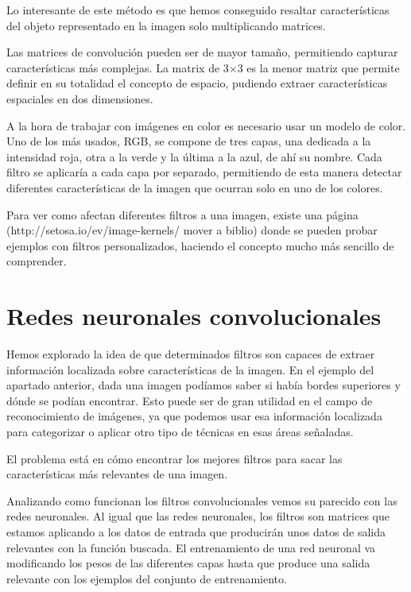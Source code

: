 Lo interesante de este método es que hemos conseguido resaltar características del objeto representado en la imagen solo multiplicando matrices.

Las matrices de convolución pueden ser de mayor tamaño, permitiendo capturar características más complejas. La matrix de 3$\times$3 es la menor matriz que permite definir en su totalidad el concepto de espacio, pudiendo extraer características espaciales en dos dimensiones.

A la hora de trabajar con imágenes en color es necesario usar un modelo de color. Uno de los más usados, RGB, se compone de tres capas, una dedicada a la intensidad roja, otra a la verde y la última a la azul, de ahí su nombre. Cada filtro se aplicaría a cada capa por separado, permitiendo de esta manera detectar diferentes características de la imagen que ocurran solo en uno de los colores.

Para ver como afectan diferentes filtros a una imagen, existe una página (http://setosa.io/ev/image-kernels/ mover a biblio) donde se pueden probar ejemplos con filtros personalizados, haciendo el concepto mucho más sencillo de comprender.

\section{Redes neuronales convolucionales}
\label{sec:conv-net}

Hemos explorado la idea de que determinados filtros son capaces de extraer información localizada sobre características de la imagen. En el ejemplo del apartado anterior, dada una imagen podíamos saber si había bordes superiores y dónde se podían encontrar. Esto puede ser de gran utilidad en el campo de reconocimiento de imágenes, ya que podemos usar esa información localizada para categorizar o aplicar otro tipo de técnicas en esas áreas señaladas.

El problema está en cómo encontrar los mejores filtros para sacar las características más relevantes de una imagen.

Analizando como funcionan los filtros convolucionales vemos su parecido con las redes neuronales. Al igual que las redes neuronales, los filtros son matrices que estamos aplicando a los datos de entrada que producirán unos datos de salida relevantes con la función buscada. El entrenamiento de una red neuronal va modificando los pesos de las diferentes capas hasta que produce una salida relevante con los ejemplos del conjunto de entrenamiento.

